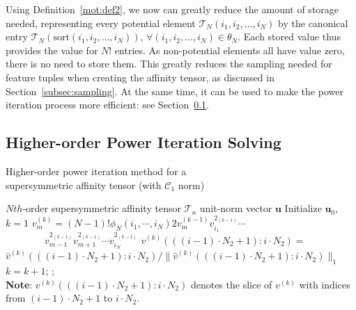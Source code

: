 Using Definition~\ref{mot:def2}, we now can greatly reduce the amount of storage needed, representing every potential element $\mathcal{T}_N(i_1,i_2,\ldots,i_N)$ by the canonical entry $\mathcal{T}_N(\mathrm{sort}(i_1,i_2,\ldots,i_N))$, $\forall (i_1,i_2,\ldots,i_N)\in \theta_N$. Each stored value thus provides the value for $N!$ entries.
As non-potential elements all have value zero, there is no need to store them.
This greatly reduces the sampling
needed for feature tuples when creating the affinity tensor, as discussed in Section~\ref{subsec:sampling}.
At the same time, it can be used to make the power iteration process more efficient: see Section~\ref{subsec:oursymmhopm}.

\subsection{Higher-order Power Iteration Solving}
\label{subsec:oursymmhopm}

\begin{algorithm}[!t]
\caption{\small Higher-order power iteration method for a \protect\\
         \mbox{}\hspace{15ex}\small supersymmetric affinity tensor (with $\mathcal{C}_1$ norm)}
\label{alg2}
\begin{algorithmic}[1]
\REQUIRE \small $Nth$-order supersymmetric affinity tensor $\mathcal{T}_n$
\ENSURE  \small unit-norm vector $\boldsymbol{u}$
\STATE   \small \; Initialize $\boldsymbol{u}_0$, $k=1$
\REPEAT
        \STATE $v_{m}^{(k)}=(N-1)!\phi_N(i_1,\cdots , i_N) 2v_{m}^{(k-1)}v_{i_1}^{2_{(k-1)}}\cdots$ \\
                 $\qquad \qquad v_{m-1}^{2_{(k-1)}}v_{m+1}^{2_{(k-1)}}\cdots v_{i_N}^{2_{(k-1)}}$
        \ENDFOR
        \STATE $v^{(k)}(((i-1)\cdot N_2+1) : i\cdot N_2)=$   \protect\\
               $\hat{v}^{(k)}(((i-1)\cdot N_2+1) : i\cdot N_2)/\lVert \hat{v}^{(k)}(((i-1)\cdot N_2+1):i\cdot N_2)\lVert_1$
        \ENDFOR
    \ENDFOR
    \STATE $k=k+1$;
;\protect\\
       \small \textbf{Note}: $v^{(k)}(((i-1)\cdot N_2+1) : i\cdot N_2)$ denotes the slice of $v^{(k)}$ with
       \small indices from $(i-1)\cdot N_2+1$ to $i\cdot N_2$.
\end{algorithmic}
\end{algorithm}

